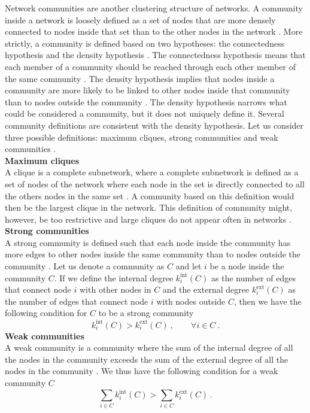 \documentclass[11 pt , letterpaper , twoside , openright]{book}
\begin{document}
Network communities are another clustering structure of networks. A community inside a network is loosely defined as a set of nodes that are more densely connected to nodes inside that set than to the other nodes in the network \cite{Saha2015}. More strictly, a community is defined based on two hypotheses: the connectedness hypothesis and the density hypothesis \cite{Albert2016}. The connectedness hypothesis means that each member of a community should be reached through each other member of the same community \cite{Albert2016}. The density hypothesis implies that nodes inside a community are more likely to be linked to other nodes inside that community than to nodes outside the community \cite{Albert2016}. The density hypothesis narrows what could be considered a community, but it does not uniquely define it. Several community definitions are consistent with the density hypothesis. Let us consider three possible definitions: maximum cliques, strong communities and weak communities \cite{Albert2016}.\\
\newline
\textbf{Maximum cliques}\\
\newline
A clique is a complete subnetwork, where a complete subnetwork is defined as a set of nodes of the network where each node in the set is directly connected to all the others nodes in the same set \cite{Albert2016}. A community based on this definition would then be the largest clique in the network. This definition of community might, however, be too restrictive and large cliques do not appear often in networks \cite{Albert2016}.\\   
\newpage
\noindent
\textbf{Strong communities}\\
\newline
A strong community is defined such that each node inside the community has more edges to other nodes inside the same community than to nodes outside the community \cite{Albert2016}\cite{F.Costa2007}. Let us denote a community as $C$ and let $i$ be a node inside the community $C$. If we define the internal degree $k_i^{\textrm{int}}(C)$ as the number of edges that connect node $i$ with other nodes in $C$ and the external degree $k_i^{\textrm{ext}}(C)$ as the number of edges that connect node $i$ with nodes outside $C$, then we have the following condition for $C$ to be a strong community \cite{Albert2016}
\begin{equation}
	k_i^{\textrm{int}}(C) > k_i^{\textrm{ext}}(C) \ , \qquad \forall i \in C \ .
\end{equation}
\newline
\textbf{Weak communities}\\
\newline
A weak community is a community where the sum of the internal degree of all the nodes in the community exceeds the sum of the external degree of all the nodes in the community \cite{Albert2016}\cite{F.Costa2007}. We thus have the following condition for a weak community $C$ \cite{Albert2016}
\begin{equation}
	\sum_{i \in C} k_i^{\textrm{int}}(C) > \sum_{i \in C}k_i^{\textrm{ext}}(C) \ .
\end{equation}
\end{document}
